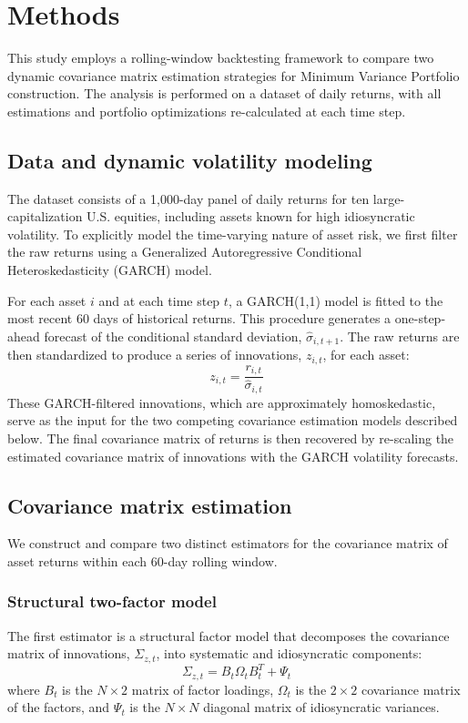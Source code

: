 \documentclass[]{article}
\begin{document}
\section{Methods}
\label{sec:methods}
This study employs a rolling-window backtesting framework to compare two dynamic covariance matrix estimation strategies for Minimum Variance Portfolio construction. The analysis is performed on a dataset of daily returns, with all estimations and portfolio optimizations re-calculated at each time step.

\subsection{Data and dynamic volatility modeling}
The dataset consists of a 1,000-day panel of daily returns for ten large-capitalization U.S. equities, including assets known for high idiosyncratic volatility. To explicitly model the time-varying nature of asset risk, we first filter the raw returns using a Generalized Autoregressive Conditional Heteroskedasticity (GARCH) model.

For each asset $i$ and at each time step $t$, a GARCH(1,1) model is fitted to the most recent 60 days of historical returns. This procedure generates a one-step-ahead forecast of the conditional standard deviation, $\hat{\sigma}_{i,t+1}$. The raw returns are then standardized to produce a series of innovations, $z_{i,t}$, for each asset:
\begin{equation}
z_{i,t} = \frac{r_{i,t}}{\hat{\sigma}_{i,t}}
\end{equation}
These GARCH-filtered innovations, which are approximately homoskedastic, serve as the input for the two competing covariance estimation models described below. The final covariance matrix of returns is then recovered by re-scaling the estimated covariance matrix of innovations with the GARCH volatility forecasts.

\subsection{Covariance matrix estimation}
We construct and compare two distinct estimators for the covariance matrix of asset returns within each 60-day rolling window.

\subsubsection{Structural two-factor model}
The first estimator is a structural factor model that decomposes the covariance matrix of innovations, $\Sigma_{z,t}$, into systematic and idiosyncratic components:
\begin{equation}
\Sigma_{z,t} = B_t \Omega_t B_t^T + \Psi_t
\end{equation}
where $B_t$ is the $N \times 2$ matrix of factor loadings, $\Omega_t$ is the $2 \times 2$ covariance matrix of the factors, and $\Psi_t$ is the $N \times N$ diagonal matrix of idiosyncratic variances.
\end{document}
